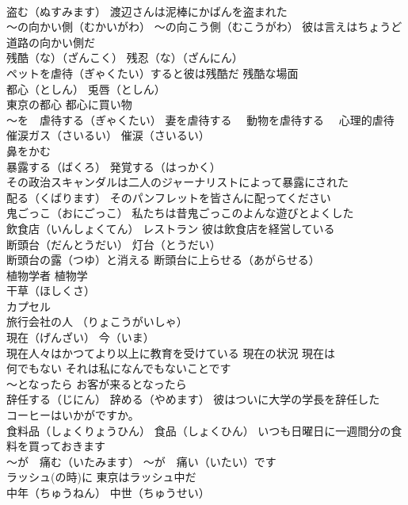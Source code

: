 \documentclass[8pt]{extreport}
\begin{document}
\begin{CJK}{UTF8}{min}
\\	盗む（ぬすみます） 渡辺さんは泥棒にかばんを盗まれた
\\	～の向かい側（むかいがわ） ～の向こう側（むこうがわ） 彼は言えはちょうど道路の向かい側だ
\\	残酷（な）（ざんこく） 残忍（な）（ざんにん）
\\	ペットを虐待（ぎゃくたい）すると彼は残酷だ 残酷な場面
\\	都心（としん） 兎唇（としん）
\\	東京の都心 都心に買い物
\\	～を　虐待する（ぎゃくたい） 妻を虐待する　 動物を虐待する　 心理的虐待
\\	催涙ガス（さいるい） 催涙（さいるい） 
\\	鼻をかむ
\\	暴露する（ばくろ） 発覚する（はっかく）
\\	その政治スキャンダルは二人のジャーナリストによって暴露にされた
\\	配る（くばります） そのパンフレットを皆さんに配ってください
\\	鬼ごっこ（おにごっこ） 私たちは昔鬼ごっこのよんな遊びとよくした
\\	飲食店（いんしょくてん） レストラン 彼は飲食店を経営している
\\	断頭台（だんとうだい） 灯台（とうだい）
\\	断頭台の露（つゆ）と消える 断頭台に上らせる（あがらせる）
\\	植物学者 植物学
\\	干草（ほしくさ）
\\	カプセル
\\	旅行会社の人 （りょこうがいしゃ）
\\	現在（げんざい） 今（いま）
\\	現在人々はかつてより以上に教育を受けている 現在の状況 現在は
\\	何でもない それは私になんでもないことです
\\	～となったら お客が来るとなったら
\\	辞任する（じにん） 辞める（やめます） 彼はついに大学の学長を辞任した
\\	コーヒーはいかがですか。
\\	食料品（しょくりょうひん） 食品（しょくひん） いつも日曜日に一週間分の食料を買っておきます
\\	～が　痛む（いたみます） ～が　痛い（いたい）です
\\	ラッシュ(の時)に 東京はラッシュ中だ
\\	中年（ちゅうねん） 中世（ちゅうせい）

\end{CJK}
\end{document}
